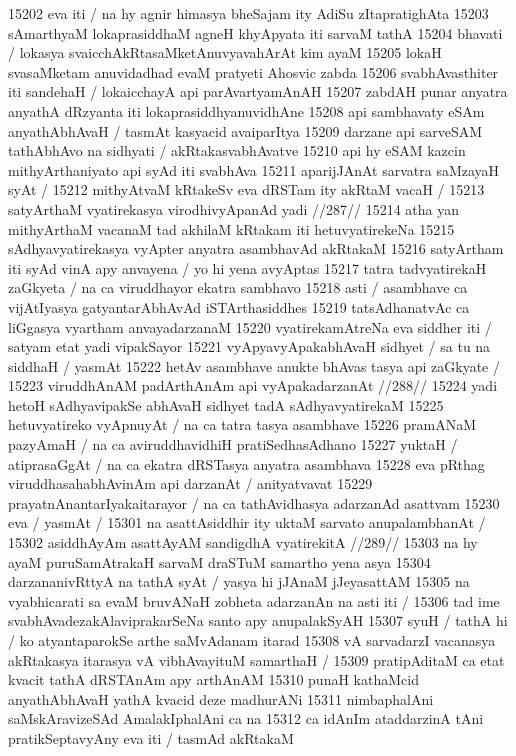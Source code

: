 15202 eva iti / na hy agnir himasya bheSajam ity AdiSu zItapratighAta
15203 sAmarthyaM lokaprasiddhaM agneH khyApyata iti sarvaM tathA
15204 bhavati / lokasya svaicchAkRtasaMketAnuvyavahArAt kim ayaM  
15205 lokaH svasaMketam anuvidadhad evaM pratyeti Ahosvic zabda  
15206 svabhAvasthiter iti sandehaH / lokaicchayA api parAvartyamAnAH  
15207 zabdAH punar anyatra anyathA dRzyanta iti lokaprasiddhyanuvidhAne 
15208 api sambhavaty eSAm anyathAbhAvaH / tasmAt kasyacid avaiparItya  
15209 darzane api sarveSAM tathAbhAvo na sidhyati / akRtakasvabhAvatve  
15210 api hy eSAM kazcin mithyArthaniyato api syAd iti svabhAva
15211 aparijJAnAt sarvatra saMzayaH syAt /  
15212 	mithyAtvaM kRtakeSv eva dRSTam ity akRtaM vacaH / 
15213 	satyArthaM vyatirekasya virodhivyApanAd yadi //287//
15214 atha yan mithyArthaM vacanaM tad akhilaM kRtakam iti hetuvyatirekeNa  
15215 sAdhyavyatirekasya vyApter anyatra asambhavAd akRtakaM 
15216 satyArtham iti syAd vinA apy anvayena / yo hi yena avyAptas 
15217 tatra tadvyatirekaH zaGkyeta / na ca viruddhayor ekatra sambhavo
15218 asti / asambhave ca vijAtIyasya gatyantarAbhAvAd iSTArthasiddhes
15219 tatsAdhanatvAc ca liGgasya vyartham anvayadarzanaM  
15220 vyatirekamAtreNa eva siddher iti / satyam etat yadi vipakSayor 
15221 vyApyavyApakabhAvaH sidhyet / sa tu na siddhaH / yasmAt
15222 	hetAv asambhave anukte bhAvas tasya api zaGkyate /  
15223 	viruddhAnAM padArthAnAm api vyApakadarzanAt //288// 
15224 yadi hetoH sAdhyavipakSe abhAvaH sidhyet tadA sAdhyavyatirekaM
15225 hetuvyatireko vyApnuyAt / na ca tatra tasya asambhave
15226 pramANaM pazyAmaH / na ca aviruddhavidhiH pratiSedhasAdhano 
15227 yuktaH / atiprasaGgAt / na ca ekatra dRSTasya anyatra asambhava 
15228 eva pRthag viruddhasahabhAvinAm api darzanAt / anityatvavat 
15229 prayatnAnantarIyakaitarayor / na ca tathAvidhasya adarzanAd asattvam 
15230 eva / yasmAt /  
15301 	na asattAsiddhir ity uktaM sarvato anupalambhanAt /
15302 	asiddhAyAm asattAyAM sandigdhA vyatirekitA //289// 
15303 na hy ayaM puruSamAtrakaH sarvaM draSTuM samartho yena asya 
15304 darzananivRttyA na tathA syAt / yasya hi jJAnaM jJeyasattAM  
15305 na vyabhicarati sa evaM bruvANaH zobheta adarzanAn na asti iti /  
15306 tad ime svabhAvadezakAlaviprakarSeNa santo apy anupalakSyAH
15307 syuH / tathA hi / ko atyantaparokSe arthe saMvAdanam itarad 
15308 vA sarvadarzI vacanasya akRtakasya itarasya vA vibhAvayituM samarthaH /
15309 pratipAditaM ca etat kvacit tathA dRSTAnAm apy arthAnAM 
15310 punaH kathaMcid anyathAbhAvaH yathA kvacid deze madhurANi 
15311 nimbaphalAni saMskAravizeSAd AmalakIphalAni ca na 
15312 ca idAnIm ataddarzinA tAni pratikSeptavyAny eva iti / tasmAd akRtakaM
